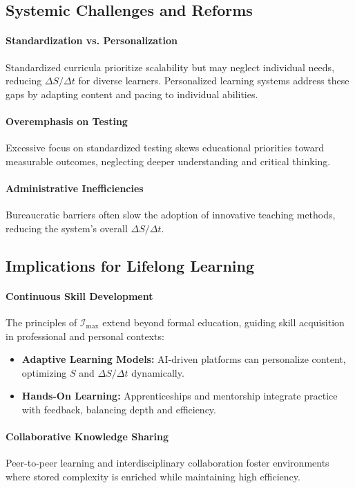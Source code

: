 \documentclass[12pt]{article}
\begin{document}
\subsection{Systemic Challenges and Reforms}
\paragraph{Standardization vs. Personalization}
Standardized curricula prioritize scalability but may neglect individual needs, reducing \( \Delta S / \Delta t \) for diverse learners. Personalized learning systems address these gaps by adapting content and pacing to individual abilities.

\paragraph{Overemphasis on Testing}
Excessive focus on standardized testing skews educational priorities toward measurable outcomes, neglecting deeper understanding and critical thinking.

\paragraph{Administrative Inefficiencies}
Bureaucratic barriers often slow the adoption of innovative teaching methods, reducing the system’s overall \( \Delta S / \Delta t \).

\subsection{Implications for Lifelong Learning}
\paragraph{Continuous Skill Development}
The principles of \( \mathcal{I}_{\text{max}} \) extend beyond formal education, guiding skill acquisition in professional and personal contexts:
\begin{itemize}
    \item \textbf{Adaptive Learning Models:} AI-driven platforms can personalize content, optimizing \( S \) and \( \Delta S / \Delta t \) dynamically.
    \item \textbf{Hands-On Learning:} Apprenticeships and mentorship integrate practice with feedback, balancing depth and efficiency.
\end{itemize}

\paragraph{Collaborative Knowledge Sharing}
Peer-to-peer learning and interdisciplinary collaboration foster environments where stored complexity is enriched while maintaining high efficiency.
\end{document}
